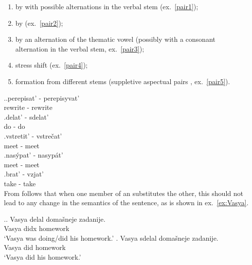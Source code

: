 \begin{enumerate}[noitemsep]
\item by  with possible alternations in the verbal stem (ex.~\ref{pair1});
\item by  (ex.~\ref{pair2});
\item by an alternation of the thematic vowel   (possibly with a consonant alternation in the verbal stem, ex.~\ref{pair3});
\item stress shift   (ex.~\ref{pair4});
\item formation from different stems (suppletive   aspectual pairs , ex.~\ref{pair5}).
\end{enumerate}

\ex.\ag.\label{pair1}perepisat'\textsuperscript{\PF} - perepisyvat'\textsuperscript{\IPF}\\
rewrite - rewrite\\
\bg.\label{pair2}delat'\textsuperscript{\IPF} - sdelat'\textsuperscript{\PF}\\
do - do\\
\bg.\label{pair3}vstretit'\textsuperscript{\PF} - vstre\v{c}at'\textsuperscript{\IPF}\\
meet - meet\\
\bg.\label{pair4}nas\'ypat'\textsuperscript{\PF} - nasyp\'at'\textsuperscript{\IPF}\\
meet - meet\\
\bg.\label{pair5}brat'\textsuperscript{\IPF} - vzjat'\textsuperscript{\PF}\\
take - take\\

From  follows that when one member of an  substitutes the other, this should not lead to any change in the semantics of the sentence, as is shown in ex.~\ref{ex:Vasya}.

\ex.\label{ex:Vasya}\ag. Vasya delal\textsuperscript{\IPF} {doma\v{s}neje zadanije}.\\
Vasya didx homework\\
\trans `Vasya was doing/did his homework.'
\bg. Vasya sdelal\textsuperscript{\PF} {doma\v{s}neje zadanije}.\\
Vasya did homework\\
\trans `Vasya did his homework.'

